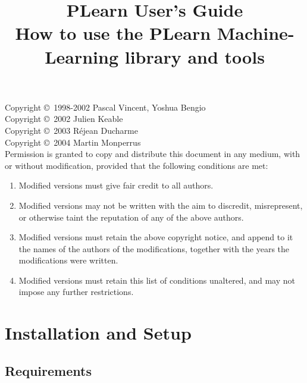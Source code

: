 \documentclass[11pt]{book}
\title{{\Huge PLearn User's Guide\\ \Large How to use the PLearn Machine-Learning library and tools}}
\begin{document}

\maketitle

\vspace*{9cm}

Copyright \copyright\ 1998-2002 Pascal Vincent, Yoshua Bengio \\
Copyright \copyright\ 2002 Julien Keable \\
Copyright \copyright\ 2003 R\'ejean Ducharme \\
Copyright \copyright\ 2004 Martin Monperrus \\

Permission is granted to copy and distribute this document in any medium,
with or without modification, provided that the following conditions are
met:

\begin{enumerate}
\item Modified versions must give fair credit to all authors.
\item Modified versions may not be written with the aim to discredit, misrepresent, or otherwise taint the
      reputation of any of the above authors.
\item Modified versions must retain the above copyright notice, and append to
   it the names of the authors of the modifications, together with the years the
   modifications were written.
\item Modified versions must retain this list of conditions unaltered, 
    and may not impose any further restrictions.
\end{enumerate}

\tableofcontents



\chapter{Installation and Setup}
\label{chap:label}

\section{Requirements}
\end{document}
